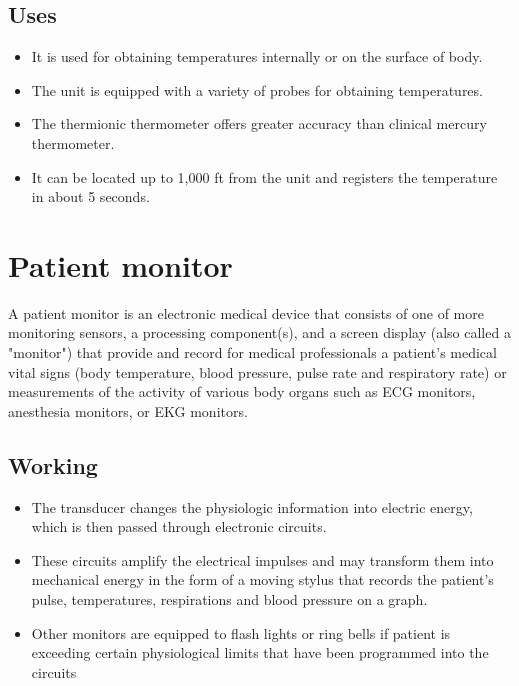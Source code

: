 \documentclass[12pt]{book}
\begin{document}
\subsection{Uses}
\begin{itemize}
\item It is used for obtaining temperatures internally or on the surface of body.
\item The unit is equipped with a variety of probes for obtaining
temperatures.
\item The thermionic thermometer offers greater accuracy than clinical mercury thermometer.
\item It can be located up to 1,000 ft from the unit and registers the temperature in about 5 seconds.

\end{itemize}

\section{Patient monitor}
A patient monitor is an electronic medical device that consists of one of more monitoring sensors, a processing component(s), and a screen display (also called a "monitor") that provide and record for medical professionals a patient's medical vital signs (body temperature, blood pressure, pulse rate and respiratory rate) or measurements of the activity of various body organs such as ECG monitors, anesthesia monitors, or EKG monitors.


\subsection{Working}
\begin{itemize}
    \item The transducer changes the physiologic information into
electric energy, which is then passed through electronic circuits.
\item These
circuits amplify the electrical impulses and may transform them into
mechanical energy in the form of a moving stylus that records the
patient’s pulse, temperatures, respirations and blood pressure on a
graph.
\item
Other monitors are equipped to flash lights or ring bells if patient
is exceeding certain physiological limits that have been programmed
into the circuits
\end{itemize}
\end{document}
